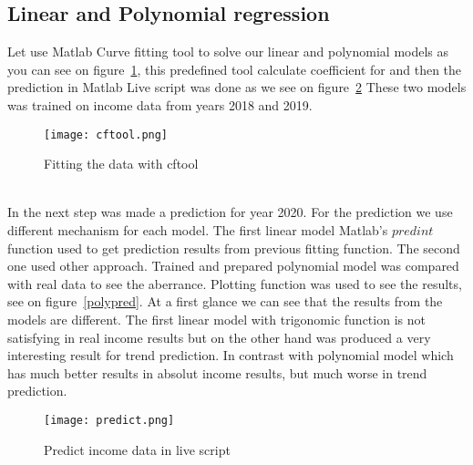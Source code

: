 \subsection{Linear and Polynomial regression} \label{sec:baseline}
Let use Matlab Curve fitting tool to solve our linear and polynomial models as you can see on figure~\ref{cftool}, this predefined tool calculate coefficient for and then
the prediction in Matlab Live script was done as we see on figure~\ref{predict}
These two models was trained on income data from years 2018 and 2019.
\begin{figure}[h!]
    \begin{center}
        \texttt{[image: cftool.png]}
    \end{center}
    \caption{Fitting the data with cftool~\cite{luarn}}
    \label{cftool}
\end{figure}\\
In the next step was made a prediction for year 2020.
For the prediction we use different mechanism for each model.
The first linear model Matlab's $predint$ function used to get prediction results from previous fitting function.
The second one used other approach.
Trained and prepared polynomial model was compared with real data to see the aberrance.
Plotting function was used to see the results, see on figure~\ref{polypred}.
At a first glance we can see that the results from the models are different.
The first linear model with trigonomic function
is not satisfying in real income results but on the other hand was produced a very interesting result for trend prediction.
In contrast with polynomial model which has much better results in absolut income results, but much worse in trend prediction.\\
\begin{figure}[h!]
    \begin{center}
        \texttt{[image: predict.png]}
    \end{center}
    \caption{Predict income data in live script~\cite{luarn}}
    \label{predict}
\end{figure}\\
